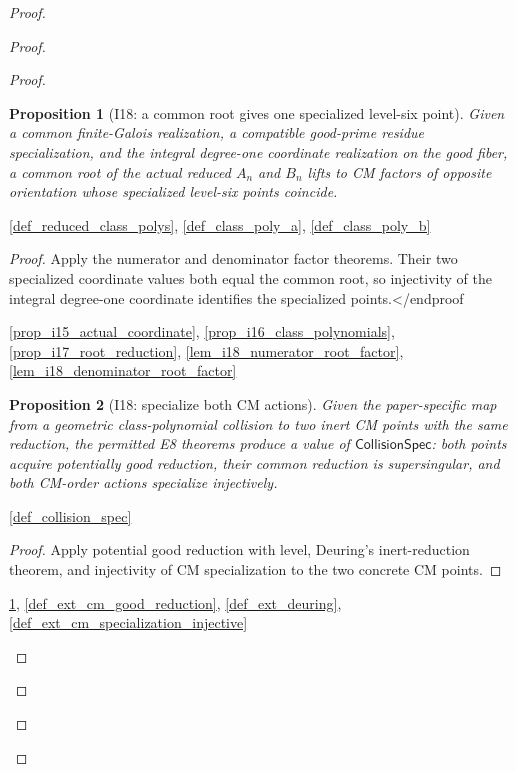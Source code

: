 \documentclass[11pt,a4paper]{article}
\numberwithin{equation}{section}
\theoremstyle{plain}\newtheorem{theorem}{Theorem}[section]\newaliascnt{proposition}{theorem}\newtheorem{proposition}[proposition]{Proposition}\aliascntresetthe{proposition}\newaliascnt{lemma}{theorem}\newtheorem{lemma}[lemma]{Lemma}\aliascntresetthe{lemma}
\theoremstyle{definition}\newaliascnt{definition}{theorem}\newtheorem{definition}[definition]{Definition}\aliascntresetthe{definition}\newaliascnt{notation}{theorem}\newtheorem{notation}[notation]{Notation}\aliascntresetthe{notation}
\providecommand{\lean}[1]{}\providecommand{\leanok}{}
\begin{document}
\begin{proof}
\begin{proof}
\begin{proof}
\begin{proposition}[I18: a common root gives one specialized level-six point]\label{prop_i18_common_point}\lean{SptCM.CM.Repaired.ActualClassPolynomialSpec.actual_common_point_of_common_root}\leanok
Given a common finite-Galois realization, a compatible good-prime residue
specialization, and the integral degree-one coordinate realization on the
good fiber, a common root of the actual reduced $A_n$ and $B_n$ lifts to CM
factors of opposite orientation whose specialized level-six points coincide.
\end{proposition}
\begin{uses-statement}\ref{def_reduced_class_polys}, \ref{def_class_poly_a}, \ref{def_class_poly_b}\end{uses-statement}
\begin{proof}Apply the numerator and denominator factor theorems.  Their two
specialized coordinate values both equal the common root, so injectivity of
the integral degree-one coordinate identifies the specialized points.</end{proof}
\begin{uses-proof}\ref{prop_i15_actual_coordinate}, \ref{prop_i16_class_polynomials}, \ref{prop_i17_root_reduction}, \ref{lem_i18_numerator_root_factor}, \ref{lem_i18_denominator_root_factor}\end{uses-proof}

\begin{proposition}[I18: specialize both CM actions]\label{prop_i18_specialized_actions}\lean{SptCM.Repair.common_root_specialization_exists}\leanok
Given the paper-specific map from a geometric class-polynomial collision to
two inert CM points with the same reduction, the permitted E8 theorems produce
a value of $\mathsf{CollisionSpec}$: both points acquire potentially good
reduction, their common reduction is supersingular, and both CM-order actions
specialize injectively.
\end{proposition}
\begin{uses-statement}\ref{def_collision_spec}\end{uses-statement}
\begin{proof}Apply potential good reduction with level, Deuring's inert-reduction theorem, and injectivity of CM specialization to the two concrete CM points.\end{proof}
\begin{uses-proof}\ref{prop_i18_common_point}, \ref{def_ext_cm_good_reduction}, \ref{def_ext_deuring}, \ref{def_ext_cm_specialization_injective}\end{uses-proof}


\end{proof}
\end{proof}
\end{proof}
\end{proof}
\end{document}
